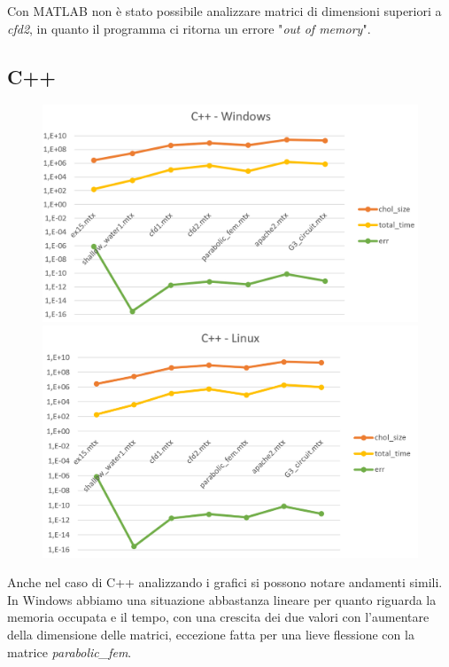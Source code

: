 \documentclass[a4paper,12pt]{article}
\begin{document}
\noindent Con MATLAB non è stato possibile analizzare matrici di dimensioni superiori a \textit{cfd2}, in quanto il programma ci ritorna un errore "\textit{out of memory}". 

\subsection{C++}

\begin{figure}[H]
\centering
\begin{minipage}{.5\textwidth}
  \centering
  \includegraphics[width=1\linewidth]{img/c++win.png}
\end{minipage}%
\begin{minipage}{.5\textwidth}
  \centering
  \includegraphics[width=1\linewidth]{img/c++linux.png}
\end{minipage}
\end{figure}

Anche nel caso di C++ analizzando i grafici si possono notare andamenti simili.
In Windows abbiamo una situazione abbastanza lineare per quanto riguarda la memoria occupata e il tempo, con una crescita dei due valori con l’aumentare della dimensione delle matrici, eccezione fatta per una lieve flessione con la matrice \textit{parabolic\_fem}. 
\bigskip
\end{document}
